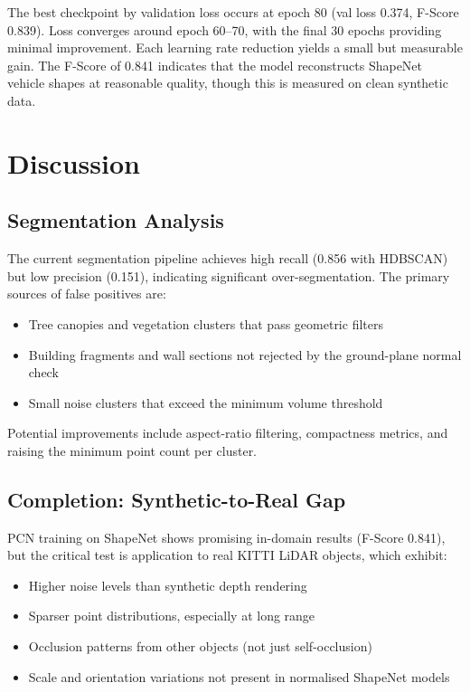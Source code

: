 \documentclass[runningheads]{llncs}
\begin{document}
The best checkpoint by validation loss occurs at epoch 80 (val loss 0.374, F-Score 0.839). Loss converges around epoch 60--70, with the final 30 epochs providing minimal improvement. Each learning rate reduction yields a small but measurable gain. The F-Score of 0.841 indicates that the model reconstructs ShapeNet vehicle shapes at reasonable quality, though this is measured on clean synthetic data.


\section{Discussion}

\subsection{Segmentation Analysis}

The current segmentation pipeline achieves high recall (0.856 with HDBSCAN) but low precision (0.151), indicating significant over-segmentation. The primary sources of false positives are:
\begin{itemize}
    \item Tree canopies and vegetation clusters that pass geometric filters
    \item Building fragments and wall sections not rejected by the ground-plane normal check
    \item Small noise clusters that exceed the minimum volume threshold
\end{itemize}

Potential improvements include aspect-ratio filtering, compactness metrics, and raising the minimum point count per cluster.

\subsection{Completion: Synthetic-to-Real Gap}

PCN training on ShapeNet shows promising in-domain results (F-Score 0.841), but the critical test is application to real KITTI LiDAR objects, which exhibit:
\begin{itemize}
    \item Higher noise levels than synthetic depth rendering
    \item Sparser point distributions, especially at long range
    \item Occlusion patterns from other objects (not just self-occlusion)
    \item Scale and orientation variations not present in normalised ShapeNet models
\end{itemize}
\end{document}
